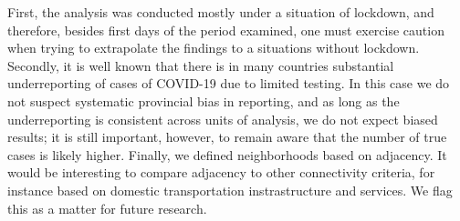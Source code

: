 \documentclass[]{elsarticle} %
\begin{document}
First, the analysis was conducted mostly under a situation of lockdown,
and therefore, besides first days of the period examined, one must
exercise caution when trying to extrapolate the findings to a situations
without lockdown. Secondly, it is well known that there is in many
countries substantial underreporting of cases of COVID-19 due to limited
testing. In this case we do not suspect systematic provincial bias in
reporting, and as long as the underreporting is consistent across units
of analysis, we do not expect biased results; it is still important,
however, to remain aware that the number of true cases is likely higher.
Finally, we defined neighborhoods based on adjacency. It would be
interesting to compare adjacency to other connectivity criteria, for
instance based on domestic transportation instrastructure and services.
We flag this as a matter for future research.
\end{document}
